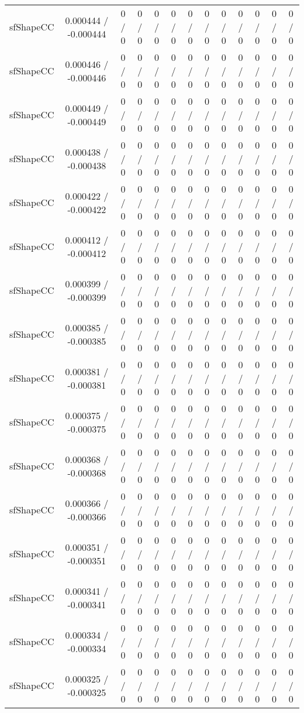 \documentclass[10pt]{article}
\begin{document}
\begin{table}[htbp]
\begin{center}
\begin{tabular}{|c|c|c|c|c|c|c|c|c|c|c|c|c|}
  sfShapeCC & 0.000444 / -0.000444 & 0 / 0 & 0 / 0 & 0 / 0 & 0 / 0 & 0 / 0 & 0 / 0 & 0 / 0 & 0 / 0 & 0 / 0 & 0 / 0 & 0 / 0 \\ 
  sfShapeCC & 0.000446 / -0.000446 & 0 / 0 & 0 / 0 & 0 / 0 & 0 / 0 & 0 / 0 & 0 / 0 & 0 / 0 & 0 / 0 & 0 / 0 & 0 / 0 & 0 / 0 \\ 
  sfShapeCC & 0.000449 / -0.000449 & 0 / 0 & 0 / 0 & 0 / 0 & 0 / 0 & 0 / 0 & 0 / 0 & 0 / 0 & 0 / 0 & 0 / 0 & 0 / 0 & 0 / 0 \\ 
  sfShapeCC & 0.000438 / -0.000438 & 0 / 0 & 0 / 0 & 0 / 0 & 0 / 0 & 0 / 0 & 0 / 0 & 0 / 0 & 0 / 0 & 0 / 0 & 0 / 0 & 0 / 0 \\ 
  sfShapeCC & 0.000422 / -0.000422 & 0 / 0 & 0 / 0 & 0 / 0 & 0 / 0 & 0 / 0 & 0 / 0 & 0 / 0 & 0 / 0 & 0 / 0 & 0 / 0 & 0 / 0 \\ 
  sfShapeCC & 0.000412 / -0.000412 & 0 / 0 & 0 / 0 & 0 / 0 & 0 / 0 & 0 / 0 & 0 / 0 & 0 / 0 & 0 / 0 & 0 / 0 & 0 / 0 & 0 / 0 \\ 
  sfShapeCC & 0.000399 / -0.000399 & 0 / 0 & 0 / 0 & 0 / 0 & 0 / 0 & 0 / 0 & 0 / 0 & 0 / 0 & 0 / 0 & 0 / 0 & 0 / 0 & 0 / 0 \\ 
  sfShapeCC & 0.000385 / -0.000385 & 0 / 0 & 0 / 0 & 0 / 0 & 0 / 0 & 0 / 0 & 0 / 0 & 0 / 0 & 0 / 0 & 0 / 0 & 0 / 0 & 0 / 0 \\ 
  sfShapeCC & 0.000381 / -0.000381 & 0 / 0 & 0 / 0 & 0 / 0 & 0 / 0 & 0 / 0 & 0 / 0 & 0 / 0 & 0 / 0 & 0 / 0 & 0 / 0 & 0 / 0 \\ 
  sfShapeCC & 0.000375 / -0.000375 & 0 / 0 & 0 / 0 & 0 / 0 & 0 / 0 & 0 / 0 & 0 / 0 & 0 / 0 & 0 / 0 & 0 / 0 & 0 / 0 & 0 / 0 \\ 
  sfShapeCC & 0.000368 / -0.000368 & 0 / 0 & 0 / 0 & 0 / 0 & 0 / 0 & 0 / 0 & 0 / 0 & 0 / 0 & 0 / 0 & 0 / 0 & 0 / 0 & 0 / 0 \\ 
  sfShapeCC & 0.000366 / -0.000366 & 0 / 0 & 0 / 0 & 0 / 0 & 0 / 0 & 0 / 0 & 0 / 0 & 0 / 0 & 0 / 0 & 0 / 0 & 0 / 0 & 0 / 0 \\ 
  sfShapeCC & 0.000351 / -0.000351 & 0 / 0 & 0 / 0 & 0 / 0 & 0 / 0 & 0 / 0 & 0 / 0 & 0 / 0 & 0 / 0 & 0 / 0 & 0 / 0 & 0 / 0 \\ 
  sfShapeCC & 0.000341 / -0.000341 & 0 / 0 & 0 / 0 & 0 / 0 & 0 / 0 & 0 / 0 & 0 / 0 & 0 / 0 & 0 / 0 & 0 / 0 & 0 / 0 & 0 / 0 \\ 
  sfShapeCC & 0.000334 / -0.000334 & 0 / 0 & 0 / 0 & 0 / 0 & 0 / 0 & 0 / 0 & 0 / 0 & 0 / 0 & 0 / 0 & 0 / 0 & 0 / 0 & 0 / 0 \\ 
  sfShapeCC & 0.000325 / -0.000325 & 0 / 0 & 0 / 0 & 0 / 0 & 0 / 0 & 0 / 0 & 0 / 0 & 0 / 0 & 0 / 0 & 0 / 0 & 0 / 0 & 0 / 0 \\ 

\end{tabular}
\end{center}
\end{table}
\end{document}
